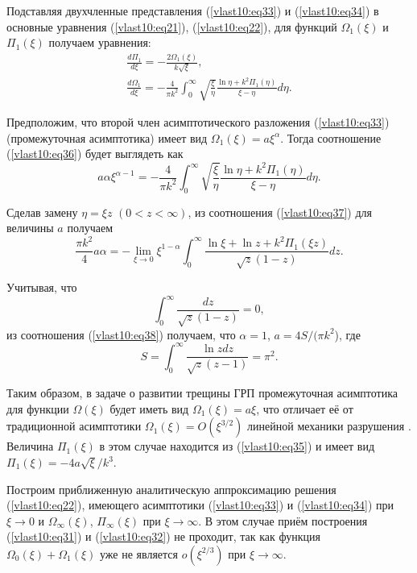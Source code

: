 Подставляя двухчленные представления (\ref{vlast10:eq33}) и (\ref{vlast10:eq34}) в основные уравнения (\ref{vlast10:eq21}), (\ref{vlast10:eq22}),
для функций $\Omega _1 ( \xi )$ и $\Pi_1 ( \xi )$ получаем уравнения:
\begin{gather}
\frac{ d \Pi_1}{d\xi} =  - \frac{2 \Omega_1 ( \xi)}{k \sqrt \xi},\label{vlast10:eq35}\\
\frac{ d \Omega _1}{d\xi} =  - \frac{4}{\pi k^2} \int _0^\infty  \sqrt {\frac{\xi }{\eta }}  \frac{\ln
\eta  + k^2 \Pi _1 ( \eta )}{\xi  - \eta }d\eta.
\label{vlast10:eq36}
\end{gather}

Предположим, что второй член асимптотического разложения
(\ref{vlast10:eq33})
(промежуточная асимптотика) имеет вид $\Omega_1 ( \xi ) =  a \xi^\alpha$. Тогда
соотношение (\ref{vlast10:eq36})
будет выглядеть как
\begin{equation}
a \alpha \xi ^{\alpha  - 1} =  - \frac{4}{\pi k^2} \int _0^\infty  \sqrt {\frac{\xi }{\eta }}  \frac{\ln
\eta  + k^2 \Pi_1 ( \eta )}{\xi  - \eta }d\eta.
\label{vlast10:eq37}
\end{equation}

Сделав замену $\eta  = \xi z$ $(0 < z < \infty)$, из соотношения (\ref{vlast10:eq37})
для величины $a$ получаем
\begin{equation}
\frac{\pi k^2}{4}a \alpha  =  - \lim \limits_{\xi  \to 0} \xi ^{1 - \alpha} \int _0^\infty
\frac{\ln \xi  + \ln z + k^2 \Pi _1(\xi z)}{\sqrt
z (1 - z)} dz.\label{vlast10:eq38}
\end{equation}

Учитывая, что $$\int _0^\infty
\dfrac{dz}{\sqrt z (1 - z)}=0 ,$$ 
из соотношения (\ref{vlast10:eq38})
получаем, что $\alpha  = 1$,
$a = {4S}/({\pi k^2}$), где
$$S = \int _0^\infty  \dfrac{\ln zdz}{\sqrt z(z - 1)} = \pi^2.$$

Таким образом, в задаче о развитии трещины ГРП промежуточная
асимптотика для функции $\Omega ( \xi )$ будет иметь вид $\Omega _1(
\xi) = a\xi $, что отличает её от традиционной
асимптотики $\Omega _1( \xi ) = O(\xi^{3/2})$ линейной механики разрушения \cite{vlast10:4,vlast10:11}. Величина
$\Pi _1 ( \xi )$ в этом случае
находится из (\ref{vlast10:eq35})
и имеет вид $\Pi_1 (\xi) =  - {4a}\sqrt \xi/ {k^3}$.

Построим приближенную аналитическую аппроксимацию решения (\ref{vlast10:eq22}), имеющего асимптотики (\ref{vlast10:eq33})
и (\ref{vlast10:eq34})
при $\xi  \to 0$ и
$\Omega _\infty( \xi )$, $\Pi _\infty ( \xi )$ при $\xi  \to \infty $. В
этом случае приём построения (\ref{vlast10:eq31})
и (\ref{vlast10:eq32})
не проходит, так как функция $\Omega_0 (\xi)+ \Omega _1( \xi )$ уже не является $o(\xi
^{2/3})$ при $\xi  \to \infty$.

